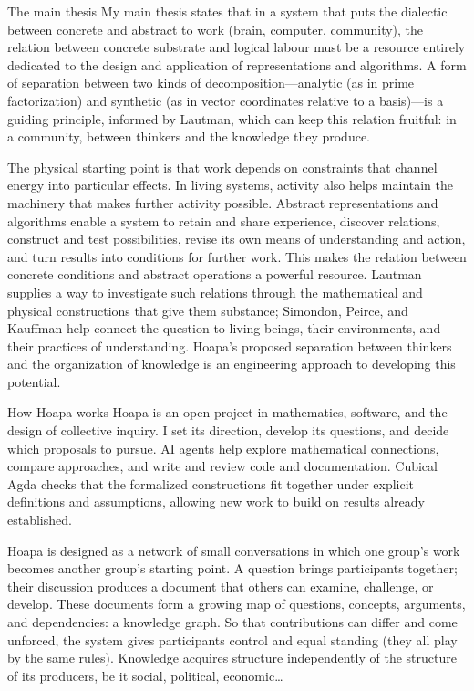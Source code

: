 \begin{frame}[t]{The main thesis}
  \small
   My main thesis states that in a system that puts the dialectic between concrete and abstract to work (brain, computer, community), the relation between concrete substrate and logical labour must be a resource entirely dedicated to the design and application of representations and algorithms. A form of separation between two kinds of decomposition—analytic (as in prime factorization) and synthetic (as in vector coordinates relative to a basis)—is a guiding principle, informed by Lautman, which can keep this relation fruitful: in a community, between thinkers and the knowledge they produce.
  \par\medskip
   The physical starting point is that work depends on constraints that channel energy into particular effects. In living systems, activity also helps maintain the machinery that makes further activity possible. Abstract representations and algorithms enable a system to retain and share experience, discover relations, construct and test possibilities, revise its own means of understanding and action, and turn results into conditions for further work. This makes the relation between concrete conditions and abstract operations a powerful resource. Lautman supplies a way to investigate such relations through the mathematical and physical constructions that give them substance; Simondon, Peirce, and Kauffman help connect the question to living beings, their environments, and their practices of understanding. Hoapa's proposed separation between thinkers and the organization of knowledge is an engineering approach to developing this potential.
\end{frame}

\begin{frame}[t]{How Hoapa works}
  \small
   Hoapa is an open project in mathematics, software, and the design of collective inquiry. I set its direction, develop its questions, and decide which proposals to pursue. AI agents help explore mathematical connections, compare approaches, and write and review code and documentation. Cubical Agda checks that the formalized constructions fit together under explicit definitions and assumptions, allowing new work to build on results already established.
  \par\medskip
   Hoapa is designed as a network of small conversations in which one group's work becomes another group's starting point. A question brings participants together; their discussion produces a document that others can examine, challenge, or develop. These documents form a growing map of questions, concepts, arguments, and dependencies: a knowledge graph. So that contributions can differ and come unforced, the system gives participants control and equal standing (they all play by the same rules). Knowledge acquires structure independently of the structure of its producers, be it social, political, economic…
\end{frame}

